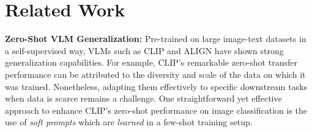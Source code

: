 \section{Related Work}
\noindent\textbf{Zero-Shot VLM Generalization:}
Pre-trained on large image-text datasets in a self-supervised way, VLMs such as CLIP \cite{radford2021learning} and ALIGN \cite{jia2021scaling} have shown strong generalization capabilities. For example, CLIP's remarkable zero-shot transfer performance can be attributed to the diversity and scale of the data on which it was trained. Nonetheless, adapting them effectively to specific downstream tasks when data is scarce remains a challenge. One straightforward yet effective approach to enhance CLIP’s zero-shot performance on image classification is the use of \textit{soft prompts} \cite{zhou2022coop} which are \textit{learned} in a few-shot training setup. 



